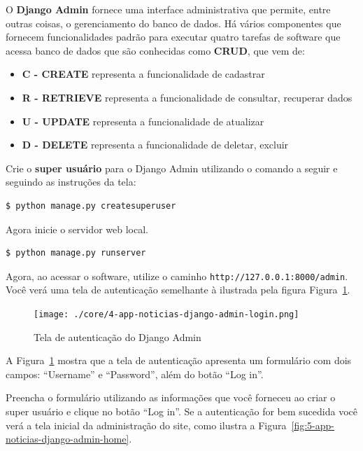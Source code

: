 \documentclass[brazil,a4paper,oneside,openright,parskip=full]{book}
\newcommand{\passthrough}[1]{#1}
\providecommand{\tightlist}{%
  \setlength{\itemsep}{0pt}\setlength{\parskip}{0pt}}
\begin{document}
O \textbf{Django Admin} fornece uma interface administrativa que
permite, entre outras coisas, o gerenciamento do banco de dados. Há
vários componentes que fornecem funcionalidades padrão para executar
quatro tarefas de software que acessa banco de dados que são conhecidas
como \textbf{CRUD}, que vem de:

\begin{itemize}
\tightlist
\item
  \textbf{C - CREATE} representa a funcionalidade de cadastrar
\item
  \textbf{R - RETRIEVE} representa a funcionalidade de consultar,
  recuperar dados
\item
  \textbf{U - UPDATE} representa a funcionalidade de atualizar
\item
  \textbf{D - DELETE} representa a funcionalidade de deletar, excluir
\end{itemize}

Crie o \textbf{super usuário} para o Django Admin utilizando o comando a
seguir e seguindo as instruções da tela:

\begin{lstlisting}[language=sh, style=nonumber]
$ python manage.py createsuperuser
\end{lstlisting}

Agora inicie o servidor web local.

\begin{lstlisting}[language=sh, style=nonumber]
$ python manage.py runserver
\end{lstlisting}

Agora, ao acessar o software, utilize o caminho
\passthrough{\lstinline!http://127.0.0.1:8000/admin!}. Você verá uma
tela de autenticação semelhante à ilustrada pela figura
Figura~\ref{fig:4-app-noticias-django-admin-login}.

\begin{figure}
\hypertarget{fig:4-app-noticias-django-admin-login}{%
\centering
\texttt{[image: ./core/4-app-noticias-django-admin-login.png]}
\caption{Tela de autenticação do Django
Admin}\label{fig:4-app-noticias-django-admin-login}
}
\end{figure}

A Figura~\ref{fig:4-app-noticias-django-admin-login} mostra que a tela
de autenticação apresenta um formulário com dois campos: ``Username'' e
``Password'', além do botão ``Log in''.

Preencha o formulário utilizando as informações que você forneceu ao
criar o super usuário e clique no botão ``Log in''. Se a autenticação
for bem sucedida você verá a tela inicial da administração do site, como
ilustra a Figura~\ref{fig:5-app-noticias-django-admin-home}.
\end{document}
